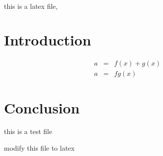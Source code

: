 this is a latex file, 


\section{Introduction}


\begin{align}
a & = & f(x)+g(x) \nonumber\\
a & = & fg(x)
\end{align}

\section{Conclusion}
this is a test file

modify this file to latex

\enddocument
